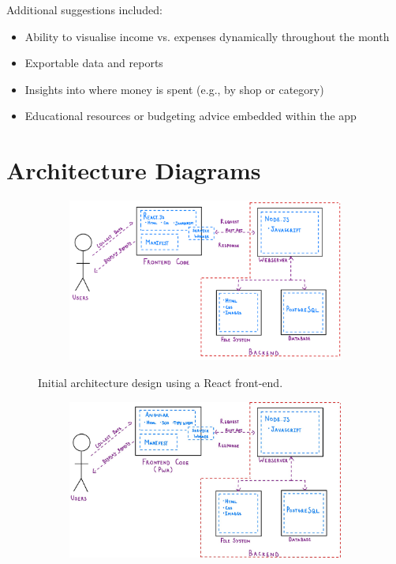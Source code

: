 \documentclass{l4proj}
\begin{document}
\begin{appendices}
Additional suggestions included:
\begin{itemize}
    \item Ability to visualise income vs. expenses dynamically throughout the month
    \item Exportable data and reports
    \item Insights into where money is spent (e.g., by shop or category)
    \item Educational resources or budgeting advice embedded within the app
\end{itemize}

\chapter{Architecture Diagrams}
\label{app:architecture}
\begin{figure}[htb] 
    \centering
    \begin{subfigure}[b]{0.75\textwidth}
        \includegraphics[width=\textwidth]{images/Architecture-Diagrams/Architecture_Diagram.jpeg}
        \label{fig:syn1}
    \end{subfigure}   
    \caption{Initial architecture design using a React front-end.}\label{fig:synthetic}
\end{figure}
\begin{figure}[htb] 
    \centering
    \begin{subfigure}[b]{0.75\textwidth}
        \includegraphics[width=\textwidth]{images/Architecture-Diagrams/Architecture_Diagram_PWA.png}

\end{subfigure}
\end{figure}
\end{appendices}
\end{document}
